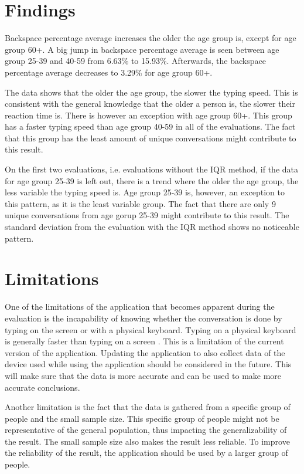 \section{Findings}

Backspace percentage average increases the older the age group is, except for age group 60+.
A big jump in backspace percentage average is seen between age group 25-39 and 40-59 from 6.63\% to 15.93\%.
Afterwards, the backspace percentage average decreases to 3.29\% for age group 60+.

The data shows that the older the age group, the slower the typing speed.
This is consistent with the general knowledge that the older a person is, the slower their reaction time is.
There is however an exception with age group 60+.
This group has a faster typing speed than age group 40-59 in all of the evaluations.
The fact that this group has the least amount of unique conversations might contribute to this result.

On the first two evaluations, i.e. evaluations without the \ac{IQR} method, if the data for age group 25-39 is left out, there is a trend where the older the age group, the less variable the typing speed is.
Age group 25-39 is, however, an exception to this pattern, as it is the least variable group.
The fact that there are only 9 unique conversations from age gorup 25-39 might contribute to this result.
The standard deviation from the evaluation with the \ac{IQR} method shows no noticeable pattern.

\section{Limitations}

One of the limitations of the application that becomes apparent during the evaluation is the incapability of knowing whether the conversation is done by typing on the screen or with a physical keyboard.
Typing on a physical keyboard is generally faster than typing on a screen \cite{Varcholik2012}.
This is a limitation of the current version of the application.
Updating the application to also collect data of the device used while using the application should be considered in the future.
This will make sure that the data is more accurate and can be used to make more accurate conclusions.

Another limitation is the fact that the data is gathered from a specific group of people and the small sample size.
This specific group of people might not be representative of the general population, thus impacting the generalizability of the result.
The small sample size also makes the result less reliable.
To improve the reliability of the result, the application should be used by a larger group of people.